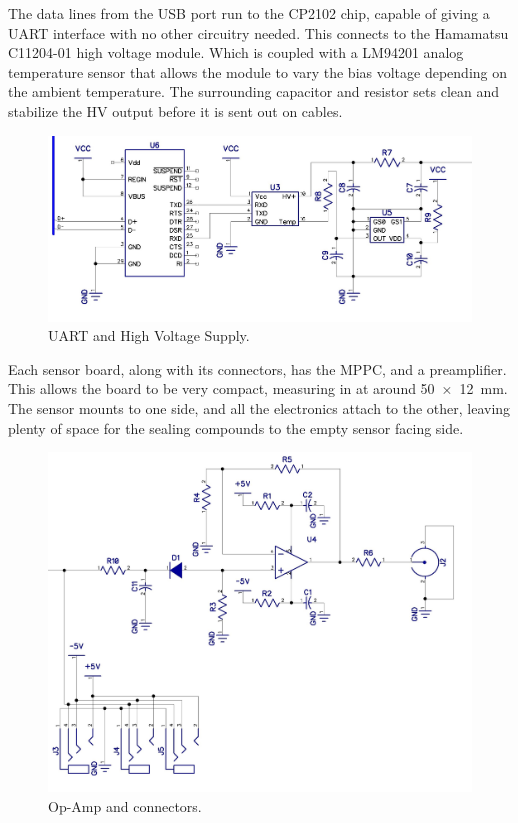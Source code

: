 \documentclass[]{Article}
\begin{document}
The data lines from the USB port run to the CP2102 chip, capable of giving a UART interface with no other circuitry needed. This connects to the Hamamatsu C11204-01 high voltage module. Which is coupled with a LM94201 analog temperature sensor that allows the module to vary the bias voltage depending on the ambient temperature. The surrounding capacitor and resistor sets clean and stabilize the HV output before it is sent out on cables.

\begin{figure}[h!]
	\centering
	\includegraphics[width=\textwidth]{assets/uarthv}
	\caption{UART and High Voltage Supply.}
\end{figure}

Each sensor board, along with its connectors, has the MPPC, and a preamplifier. This allows the board to be very compact, measuring in at around \SI{50x12}{\milli\metre}. The sensor mounts to one side, and all the electronics attach to the other, leaving plenty of space for the sealing compounds to the empty sensor facing side.

\begin{figure}[h!]
	\centering
	\includegraphics[width=\textwidth]{assets/amp}
	\caption{Op-Amp and connectors.}
\end{figure}
\end{document}
